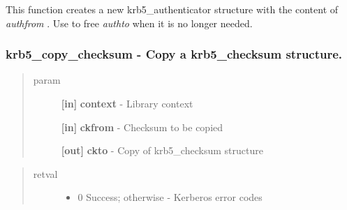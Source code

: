 \documentclass[letterpaper,10pt,english]{sphinxmanual}
\begin{document}
This function creates a new krb5\_authenticator structure with the content of \emph{authfrom} . Use {\hyperref[appdev/refs/api/krb5_free_authenticator:c.krb5_free_authenticator]{}} to free \emph{authto} when it is no longer needed.


\subsubsection{krb5\_copy\_checksum -  Copy a krb5\_checksum structure.}
\label{appdev/refs/api/krb5_copy_checksum:krb5-copy-checksum-copy-a-krb5-checksum-structure}\label{appdev/refs/api/krb5_copy_checksum::doc}

\begin{fulllineitems}
\label{appdev/refs/api/krb5_copy_checksum:c.krb5_copy_checksum}
\end{fulllineitems}

\begin{quote}\begin{description}
\item[{param}] \leavevmode
\textbf{{[}in{]}} \textbf{context} - Library context

\textbf{{[}in{]}} \textbf{ckfrom} - Checksum to be copied

\textbf{{[}out{]}} \textbf{ckto} - Copy of krb5\_checksum structure

\end{description}\end{quote}
\begin{quote}\begin{description}
\item[{retval}] \leavevmode\begin{itemize}
\item {} 
0   Success; otherwise - Kerberos error codes

\end{itemize}

\end{description}\end{quote}
\end{document}
